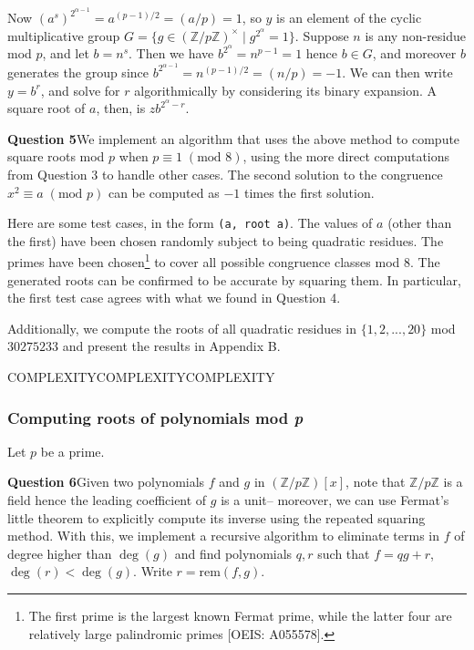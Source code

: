 \documentclass[12pt]{article}
\newcommand{\textmod}[1]{\;(\text{mod }#1)}
\begin{document}
Now \((a^s)^{2^{\alpha - 1}} = a^{(p-1)/2} = (a/p)= 1\), so \(y\) is an  element of the
cyclic multiplicative group \(G=\{g\in
(\mathbb{Z}/p\mathbb{Z})^\times\;|\;g^{2^{\alpha}} = 1\}\). Suppose \(n\) is any
non-residue mod \(p\), and let \(b=n^s\). Then we have \(b^{2^\alpha}=n^{p-1} =
1\) hence \(b\in G\), and moreover \(b\) generates the group since
\(b^{2^{\alpha - 1}}=n^{(p-1)/2} = (n/p)=-1\). We can then write \(y = b^r\),
and solve for \(r\) algorithmically by considering its binary expansion. A
square root of \(a\), then, is \(zb^{2^{\alpha}-r}\).

\textbf{Question 5}\quad We implement an algorithm that uses the above method to
compute square roots mod \(p\) when \(p\equiv 1 \textmod{8}\), using the more
direct computations from Question 3 to handle other cases. The second solution
to the congruence \(x^2\equiv a \textmod{p}\) can be computed as \(-1\) times the first
solution. 

Here are some test cases, in the form \texttt{(a, root a)}. The values of \(a\)
(other than the first) have been chosen randomly subject to being quadratic
residues. The primes have been chosen\footnote{The first prime is the largest
known Fermat prime, while the latter four are relatively large palindromic
primes [OEIS: A055578].} to cover all possible congruence classes mod \(8\). The
generated roots can be confirmed to be accurate by squaring them. In particular,
the first test case agrees with what we found in Question 4.



Additionally, we compute the roots of all quadratic residues in
\(\{1,2,...,20\}\) mod \(30275233\) and present the results in Appendix B.

COMPLEXITYCOMPLEXITYCOMPLEXITY

\subsubsection{Computing roots of polynomials mod \textit{p}}
Let \(p\) be a prime.

\textbf{Question 6}\quad Given two polynomials \(f\) and \(g\) in
\((\mathbb{Z}/p\mathbb{Z})[x]\), note that \(\mathbb{Z}/p\mathbb{Z}\) is a field
hence the leading coefficient of \(g\) is a unit-- moreover, we can use Fermat's
little theorem to explicitly compute its inverse using the repeated squaring
method. With this, we implement a recursive algorithm to eliminate terms in
\(f\) of degree higher than \(\deg(g)\) and find polynomials \(q,r\) such that
\(f = qg+r\), \(\deg(r)<\deg(g)\). Write \(r=\text{rem}(f,g)\). 
\end{document}
